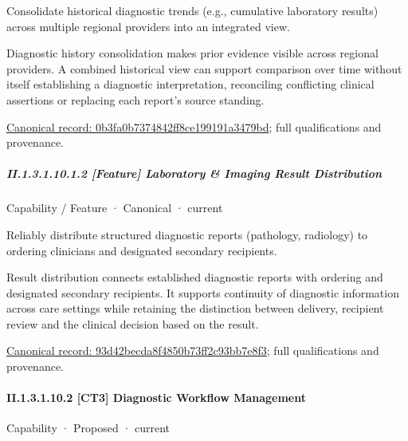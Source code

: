 Consolidate historical diagnostic trends (e.g., cumulative laboratory results) across multiple regional providers into an integrated view.



Diagnostic history consolidation makes prior evidence visible across regional providers. A combined historical view can support comparison over time without itself establishing a diagnostic interpretation, reconciling conflicting clinical assertions or replacing each report's source standing.


{\footnotesize \href{../../../../../../../continuum/strategy/capability/feature/0b3fa0b7374842ff8ce199191a3479bd.md}{Canonical record: 0b3fa0b7374842ff8ce199191a3479bd}; full qualifications and provenance.}\par
\subparagraph*{II.1.3.1.10.1.2 [Feature] Laboratory \& Imaging Result Distribution}
\label{navigation:II.1.3.1.10.1.2}

\label{element:93d42becda8f4850b73ff2c93bb7e8f3}
{\small Capability / Feature · Canonical · current}\par

Reliably distribute structured diagnostic reports (pathology, radiology) to ordering clinicians and designated secondary recipients.



Result distribution connects established diagnostic reports with ordering and designated secondary recipients. It supports continuity of diagnostic information across care settings while retaining the distinction between delivery, recipient review and the clinical decision based on the result.


{\footnotesize \href{../../../../../../../continuum/strategy/capability/feature/93d42becda8f4850b73ff2c93bb7e8f3.md}{Canonical record: 93d42becda8f4850b73ff2c93bb7e8f3}; full qualifications and provenance.}\par
\paragraph*{II.1.3.1.10.2 [CT3] Diagnostic Workflow Management}
\label{navigation:II.1.3.1.10.2}

\label{element:270ed0e32b294458aa52cf57df7e55db}
{\small Capability · Proposed · current}\par

